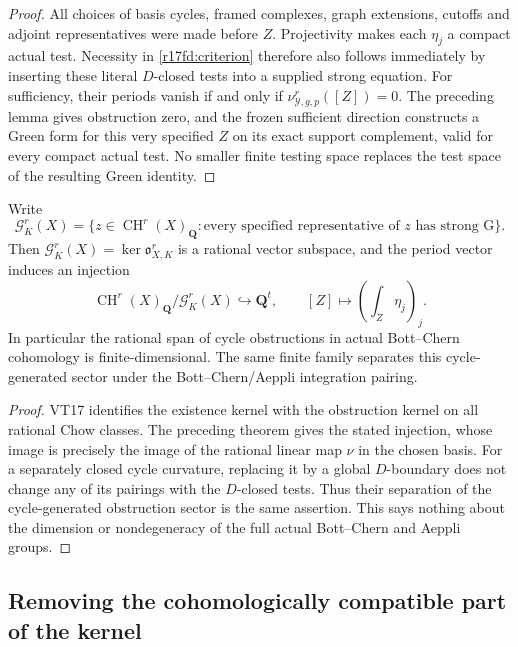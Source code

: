 \begin{proof}
All choices of basis cycles, framed complexes, graph
extensions, cutoffs and adjoint representatives were made
before $Z$. Projectivity makes each $\eta_j$ a compact
actual test. Necessity in \eqref{r17fd:criterion} therefore
also follows immediately by inserting these literal
$D$-closed tests into a supplied strong equation.
For sufficiency, their periods vanish if and only if
$\nu_{\mathcal Y,g,p}^r([Z])=0$. The preceding lemma gives
obstruction zero, and the frozen sufficient direction
constructs a Green form for this very specified $Z$ on
its exact support complement, valid for every compact
actual test. No smaller finite testing space replaces the
test space of the resulting Green identity.
\end{proof}

\begin{corollary}
\label{r17fd:local-finite}
Write
\[
 \mathcal G_K^r(X)=\{z\in\operatorname{CH}^r(X)_{\mathbf Q}:
      \text{every specified representative of $z$ has strong G}\}.
\]
Then $\mathcal G_K^r(X)=\ker\mathfrak o_{X,K}^r$ is a
rational vector subspace, and the period vector induces
an injection
\[
 \operatorname{CH}^r(X)_{\mathbf Q}/\mathcal G_K^r(X)
       \hookrightarrow\mathbf Q^t,
 \qquad [Z]\longmapsto\left(\int_Z\eta_j\right)_j.
 \tag{FD17.11}\label{r17fd:local-quotient}
\]
In particular the rational span of cycle obstructions in
actual Bott--Chern cohomology is finite-dimensional.
The same finite family separates this cycle-generated
sector under the Bott--Chern/Aeppli integration pairing.
\end{corollary}

\begin{proof}
VT17 identifies the existence kernel with the obstruction
kernel on all rational Chow classes. The preceding theorem
gives the stated injection, whose image is precisely the
image of the rational linear map $\nu$ in the chosen basis.
For a separately closed cycle curvature, replacing it by
a global $D$-boundary does not change any of its pairings
with the $D$-closed tests. Thus their separation of the
cycle-generated obstruction sector is the same assertion.
This says nothing about the dimension or nondegeneracy of
the full actual Bott--Chern and Aeppli groups.
\end{proof}

\subsection{Removing the cohomologically compatible part of the kernel}


